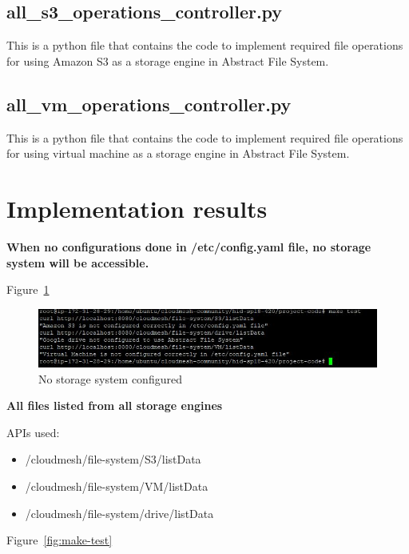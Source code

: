 \subsection{all\_s3\_operations\_controller.py}
This is a python file that contains the code to implement required file 
operations for using Amazon S3 as a storage engine in Abstract File System. 

\subsection{all\_vm\_operations\_controller.py}
This is a python file that contains the code to implement required file 
operations for using virtual machine as a storage engine in Abstract File 
System. 


\section{Implementation results}

\textbf{When no configurations done in /etc/config.yaml file, no storage 
system will be accessible.}


Figure~\ref{fig:not-configured}

\begin{figure}[!ht]
        \centering\includegraphics[width=\columnwidth]
        {image/not-configured.JPG}
        \caption{No storage system configured}\label{fig:not-configured}
\end{figure}



\textbf{All files listed from all storage engines }


APIs used:

\begin{itemize}
    \item /cloudmesh/file-system/S3/listData
    \item /cloudmesh/file-system/VM/listData
    \item /cloudmesh/file-system/drive/listData
\end{itemize}

Figure~\ref{fig:make-test}

